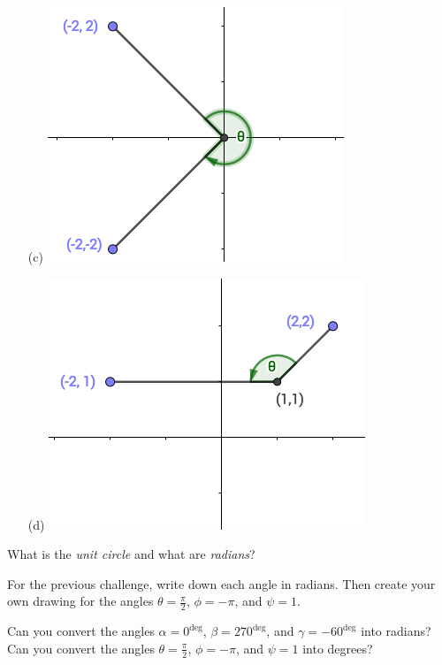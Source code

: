 \documentclass[12pt, a4paper]{article}
\begin{document}
\begin{ex}
\begin{minipage}{0.5\linewidth}
    \begin{enumerate}
    \item[(c)] \includegraphics[scale=0.40]{images/angle-3-digital}
    \item[(d)] \includegraphics[scale=0.40]{images/angle-4-digital}
    \end{enumerate}
  \end{minipage}
\end{ex}
\begin{defi}
  What is the \emph{unit circle} and what are \emph{radians}?
\end{defi}
\vs\vs
\begin{ex}
  For the previous challenge, write down each angle in radians.  Then create your own drawing for the angles $\theta = \frac{\pi}{2}$, $\phi = -\pi$, and $\psi = 1$.
\end{ex}
\begin{thrm}
\end{thrm}
\vs\vs\vs
\begin{ex}
  Can you convert the angles $\alpha = 0^\deg$, $\beta = 270^\deg$, and $\gamma = -60^\deg$ into radians?  Can you convert the angles $\theta = \frac{\pi}{2}$, $\phi = -\pi$, and $\psi = 1$ into degrees?
\end{ex}
\end{document}
